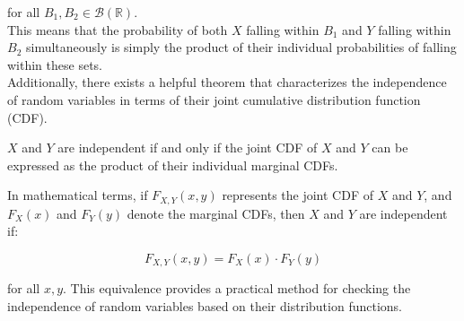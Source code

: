 for all \(B_1, B_2 \in \mathcal{B}(\mathbb{R})\). \\

This means that the probability of both \(X\) falling within \(B_1\) and \(Y\) falling within \(B_2\) simultaneously is simply the product of their individual probabilities of falling within these sets.\\

Additionally, there exists a helpful theorem that characterizes the independence of random variables in terms of their joint cumulative distribution function (CDF). 

\begin{theorem}
\(X\) and \(Y\) are independent if and only if the joint CDF of \(X\) and \(Y\) can be expressed as the product of their individual marginal CDFs.     
\end{theorem}

In mathematical terms, if \(F_{X,Y}(x,y)\) represents the joint CDF of \(X\) and \(Y\), and \(F_X(x)\) and \(F_Y(y)\) denote the marginal CDFs, then \(X\) and \(Y\) are independent if:

\[
F_{X,Y}(x,y) = F_X(x) \cdot F_Y(y)
\]

for all \(x, y\). This equivalence provides a practical method for checking the independence of random variables based on their distribution functions.

